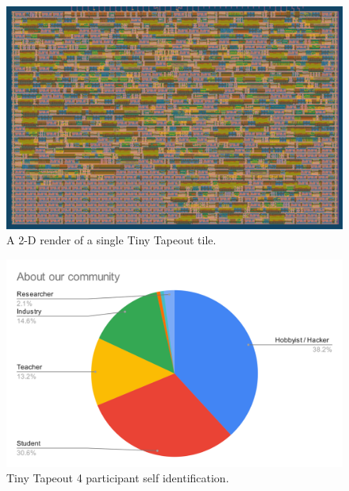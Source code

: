 \begin{figure}[!t]
\centering
\includegraphics[width=\columnwidth]{./Figs/gh action gds layout.png}
\caption{A 2-D render of a single Tiny Tapeout tile.}
\label{fig:render_cells_in_use}
\end{figure}

\begin{figure}[!t]
\centering
\includegraphics[width=\columnwidth]{./Figs/about our community pie chart.png}
\caption{Tiny Tapeout 4 participant self identification.}
\label{fig:TT04_submitters}
\end{figure}
